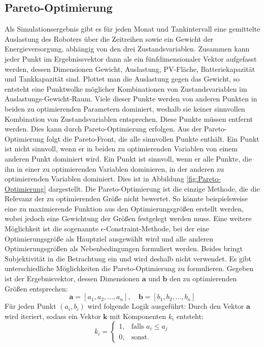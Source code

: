 \subsection{Pareto-Optimierung}
Als Simulationsergebnis gibt es für jeden Monat und Tankintervall eine gemittelte Auslastung des Roboters über die Zeitreihen sowie ein Gewicht der Energieversorgung, abhängig von den drei Zustandsvariablen. 
Zusammen kann jeder Punkt im Ergebnissvektor dann als ein fünfdimensionaler Vektor aufgefasst werden, dessen Dimensionen Gewicht, Auslastung, PV-Fläche, Batteriekapazität und Tankkapazität sind. 
Plottet man die Auslastung gegen das Gewicht, so entsteht eine Punktwolke möglicher Kombinationen von Zustandsvariablen im Auslastungs-Gewicht-Raum. Viele dieser Punkte werden von anderen Punkten in beiden zu optimierenden Parametern dominiert, weshalb sie keiner sinnvollen Kombination von Zustandsvariablen entsprechen. Diese Punkte müssen entfernt werden. Dies kann durch Pareto-Optimierung erfolgen. Aus der Pareto-Optimierung folgt die Pareto-Front, die alle sinnvollen Punkte enthält.
Ein Punkt ist nicht sinnvoll, wenn er in beiden zu optimierenden Variablen von einem anderen Punkt dominiert wird. 
Ein Punkt ist sinnvoll, wenn er alle Punkte, die ihn in einer zu optimierenden Variablen dominieren, in der anderen zu optimierenden Variablen dominiert. Dies ist in Abbildung \ref{fig:Pareto-Optimierung} dargestellt. Die Pareto-Optimierung ist die einzige Methode, die die Relevanz der zu optimierenden Größe nicht bewertet. So könnte beispielsweise eine zu maximierende Funktion aus den Optimierungsgrößen erstellt werden, wobei jedoch eine Gewichtung der Größen festgelegt werden muss. Eine weitere Möglichkeit ist die sogenannte $\epsilon$-Constraint-Methode, bei der eine Optimierungsgröße als Hauptziel ausgewählt wird und alle anderen Optimierungsgrößen als Nebenbedingungen formuliert werden. Beides bringt Subjektivität in die Betrachtung ein und wird deshalb nicht verwendet. Es gibt unterschiedliche Möglichkeiten die Pareto-Optimierung zu formulieren. Gegeben ist der Ergebnisvektor, dessen Dimensionen $\mathbf{a}$ und $\mathbf{b}$ den zu optimierenden Größen entsprechen:
\begin{equation}
\mathbf{a} = [a_1, a_2, \dots, a_n], \quad
\mathbf{b} = [b_1, b_2, \dots, b_n]
\end{equation}
Für jeden Punkt $(a_i, b_i)$ wird folgende Logik ausgeführt:
Durch den Vektor $\mathbf{a}$ wird iteriert, sodass ein Vektor $\mathbf{k}$ mit Komponenten $k_i$ entsteht:
\begin{equation}
k_i =
\begin{cases}
1, & \text{falls } a_i \leq a_j \\[1ex]
0, & \text{sonst.}
\end{cases}
\end{equation}
